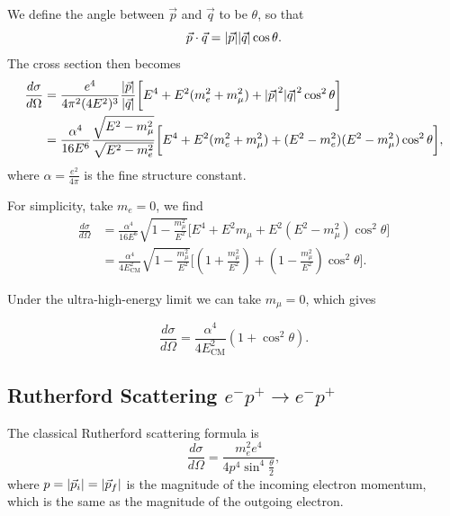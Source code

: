 \documentclass[11pt]{article}
\theoremstyle{definition}
\begin{document}
We define the angle between $\vec{p}$ and $\vec{q}$ to be $\theta$, so that
\begin{equation}
    \vec{p}\cdot\vec{q} = \abs{\vec{p}}\abs{\vec{q}}\cos\theta.
\end{equation}
The cross section then becomes
\begin{equation}
    \begin{aligned}
        \frac{d\sigma}{d\Omega} &= \frac{e^4}{4\pi^2(4E^2)^3}\frac{\abs{\vec{p}}}{\abs{\vec{q}}}\bigg[E^4 + E^2(m_e^2+m_\mu^2) + \abs{\vec{p}}^2\abs{\vec{q}}^2\cos^2\theta \bigg] \\
        &= \frac{\alpha^4}{16E^6}\frac{\sqrt{E^2-m_\mu^2}}{\sqrt{E^2-m_e^2}}\bigg[E^4 + E^2(m_e^2+m_\mu^2) + (E^2-m_e^2)(E^2-m_\mu^2)\cos^2\theta \bigg],
    \end{aligned}
\end{equation}
where $\alpha=\frac{e^2}{4\pi}$ is the fine structure constant. 

For simplicity, take $m_e=0$, we find
\begin{equation}
    \begin{aligned}
        \frac{d\sigma}{d\Omega} 
        &= \frac{\alpha^4}{16E^6}\sqrt{1-\frac{m_\mu^2}{E^2}}\bigg[E^4 + E^2m_\mu + E^2(E^2-m_\mu^2)\cos^2\theta \bigg] \\
        &= \frac{\alpha^4}{4E_\text{CM}^2}\sqrt{1-\frac{m_\mu^2}{E^2}}\bigg[\left(1+\frac{m_\mu^2}{E^2}\right) + \left(1-\frac{m_\mu^2}{E^2}\right)\cos^2\theta  \bigg].
    \end{aligned}
\end{equation}

Under the ultra-high-energy limit we can take $m_\mu=0$, which gives
\begin{shaded}
    \begin{equation}
        \frac{d\sigma}{d\Omega} = \frac{\alpha^4}{4E_\text{CM}^2}(1+\cos^2\theta).
    \end{equation}
\end{shaded}

\subsection{Rutherford Scattering $e^-p^+ \to e^-p^+$}
The classical Rutherford scattering formula is
\begin{equation}
    \frac{d\sigma}{d\Omega} = \frac{m_e^2e^4}{4p^4\sin^4\frac{\theta}{2}},
\end{equation}
where $p = \abs{\vec{p}_i} = \abs{\vec{p}_f}$ is the magnitude of the incoming electron momentum, which is the same as the magnitude of the outgoing electron.
\end{document}

